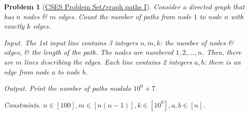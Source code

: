 \documentclass{article}
\newtheorem{problem}{Problem}
\begin{document}
\begin{problem}[\href{https://cses.fi/problemset/task/1723}{CSES Problem Set{\tt/}graph paths I}]
    Consider a directed graph that has $n$ nodes \& $m$ edges. Count the number of paths from node $1$ to node $n$ with exactly $k$ edges.
    \item {\sf Input.} The 1st input line contains 3 integers $n,m,k$: the number of nodes \& edges, \& the length of the path. The nodes are numbered $1,2,\ldots,n$. Then, there are $m$ lines describing the edges. Each line contains 2 integers $a,b$: there is an edge from node $a$ to node $b$.
    \item {\sf Output.} Print the number of paths modulo $10^9 + 7$.
    \item {\sf Constraints.} $n\in[100],m\in[n(n - 1)],k\in[10^9],a,b\in[n]$.
\end{problem}
\end{document}
